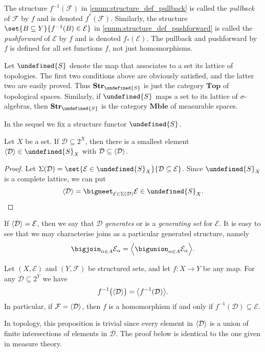 \documentclass[article, a4paper, 11pt, oneside]{memoir}
\let\mathfrak\undefined
\numberwithin{equation}{chapter}
\newcommand{\calE}{\mathcal{E}}
\newcommand{\calD}{\mathcal{D}}
\newcommand{\calF}{\mathcal{F}}
\newcommand{\strucS}{\mathfrak{S}}
\DeclarePairedDelimiter{\gen}{\langle}{\rangle} %
\newcommand{\powerset}[1]{2^{#1}}
\newcommand{\ncat}[1]{\mathbf{#1}} %
\newcommand{\catTop}{\ncat{Top}} %
\newcommand{\catMble}{\ncat{Mble}} %
\newcommand{\catStruc}[1]{\ncat{Str}_{#1}} %
\newcommand{\catStrucS}{\catStruc{\strucS}} %
\newcommand{\preim}{^{-1}}
\begin{document}
The structure $f\preim(\calF)$ in \cref{enum:structure_def_pullback} is called the \emph{pullback} of $\calF$ by $f$ and is denoted $f^*(\calF)$. Similarly, the structure $\set{B \subseteq Y}{f\preim(B) \in \calE}$ in \cref{enum:structure_def_pushforward} is called the \emph{pushforward} of $\calE$ by $f$ and is denoted $f_*(\calE)$. The pullback and pushforward by $f$ is defined for all set functions $f$, not just homomorphisms.

\begin{example}
    Let $\strucS$ denote the map that associates to a set its lattice of topologies. The first two conditions above are obviously satisfied, and the latter two are easily proved. Thus $\catStrucS$ is just the category $\catTop$ of topological spaces. Similarly, if $\strucS$ maps a set to its lattice of $\sigma$-algebras, then $\catStrucS$ is the category $\catMble$ of measurable spaces.
\end{example}

In the sequel we fix a structure functor $\strucS$.

\begin{lemma}
    Let $X$ be a set. If $\calD \subseteq \powerset{X}$, then there is a smallest element $\gen{\calD} \in \strucS_X$ with $\calD \subseteq \gen{\calD}$.
\end{lemma}

\begin{proof}
    Let $\Sigma(\calD) = \set{\calE \in \strucS_X}{\calD \subseteq \calE}$. Since $\strucS_X$ is a complete lattice, we can put
    \begin{equation*}
        \gen{\calD} = \bigmeet_{\calE \in \Sigma(\calD)} \calE \in \strucS_X.
    \end{equation*}
\end{proof}
%
If $\gen{\calD} = \calE$, then we say that $\calD$ \emph{generates} or is a \emph{generating set} for $\calE$. It is easy to see that we may characterise joins as a particular generated structure, namely
%
\begin{equation}
    \label{eq:join_as_generated_structure}
    \bigjoin_{\alpha \in A} \calE_\alpha
        = \gen[\Big]{ \bigunion_{\alpha \in A} \calE_\alpha }.
\end{equation}

\begin{proposition}
    \label{thm:preimage_and_generation_commute}
    Let $(X,\calE)$ and $(Y,\calF)$ be structured sets, and let $f \colon X \to Y$ be any map. For any $\calD \subseteq 2^Y$ we have
    \begin{equation*}
        f\preim\bigl( \gen{\calD} \bigr) = \gen[\big]{f\preim(\calD)}.
    \end{equation*}
    In particular, if $\calF = \gen{\calD}$, then $f$ is a homomorphism if and only if $f\preim(\calD) \subseteq \calE$.
\end{proposition}
%
In topology, this proposition is trivial since every element in $\gen{\calD}$ is a union of finite intersections of elements in $\calD$. The proof below is identical to the one given in measure theory.
\end{document}
